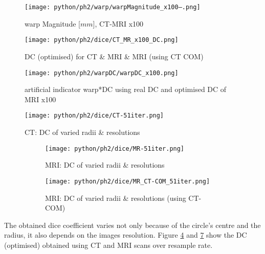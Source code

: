 \begin{figure}[!tp]
    \centering
    \texttt{[image: python/ph2/warp/warpMagnitude\_x100--.png]}
    \caption{warp Magnitude [$mm$], CT-MRI x100}
    \label{fig:warpMagnitude_x100}
\end{figure}
\begin{figure}[!bp]
    \centering
    \texttt{[image: python/ph2/dice/CT\_MR\_x100\_DC.png]}
    \caption{DC (optimised) for CT \& MRI \& MRI (using CT COM)}
    \label{fig:CT_MR_x100_DC}
\end{figure}

\begin{figure}[!tp]
    \centering
    \texttt{[image: python/ph2/warpDC/warpDC\_x100.png]}
    \caption{artificial indicator warp*DC using real DC and optimised DC of MRI x100}
    \label{fig:warpDC_x100}
\end{figure}
\begin{figure}[!bp]
  \centering
  \texttt{[image: python/ph2/dice/CT-51iter.png]}
  \caption{CT: DC of varied radii \& resolutions}
  \label{fig:CT_dc}
\end{figure}

\begin{figure}[!tbp]
  \begin{subfigure}[b]{\textwidth}
    \centering
    \texttt{[image: python/ph2/dice/MR-51iter.png]}
    \caption{MRI: DC of varied radii \& resolutions}
    \label{fig:MR_dc-opti}
  \end{subfigure}
  \begin{subfigure}[!b]{\textwidth}
    \centering
    \texttt{[image: python/ph2/dice/MR\_CT-COM\_51iter.png]}
    \caption{MRI: DC of varied radii \& resolutions (using CT-COM)}
    \label{fig:MR_CT-COM_dc-opti}
  \end{subfigure}
  \caption{}
  \label{fig:MR_dc}
\end{figure}


The obtained dice coefficient varies not only because of the circle's centre and the radius, it also depends on the images resolution.
Figure \ref{fig:CT_dc} and \ref{fig:MR_dc} show the DC (optimised) obtained using CT and MRI scans over resample rate.



